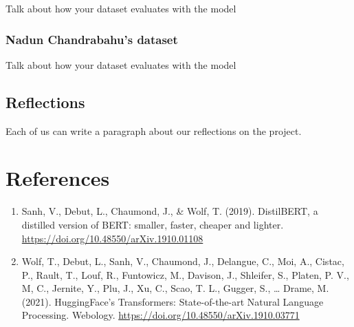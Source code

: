 \documentclass[
  11pt,
]{article}
\begin{document}
Talk about how your dataset evaluates with the model

\subsubsection{Nadun Chandrabahu's
dataset}\label{nadun-chandrabahus-dataset}

Talk about how your dataset evaluates with the model

\subsection{Reflections}\label{reflections}

Each of us can write a paragraph about our reflections on the project.

\section{References}\label{references}

\begin{enumerate}
\def\labelenumi{\arabic{enumi}.}
\item
  Sanh, V., Debut, L., Chaumond, J., \& Wolf, T. (2019). DistilBERT, a
  distilled version of BERT: smaller, faster, cheaper and lighter.
  \url{https://doi.org/10.48550/arXiv.1910.01108}
\item
  Wolf, T., Debut, L., Sanh, V., Chaumond, J., Delangue, C., Moi, A.,
  Cistac, P., Rault, T., Louf, R., Funtowicz, M., Davison, J., Shleifer,
  S., Platen, P. V., M, C., Jernite, Y., Plu, J., Xu, C., Scao, T. L.,
  Gugger, S., \ldots{} Drame, M. (2021). HuggingFace's Transformers:
  State-of-the-art Natural Language Processing. Webology.
  \url{https://doi.org/10.48550/arXiv.1910.03771}
\end{enumerate}
\end{document}
